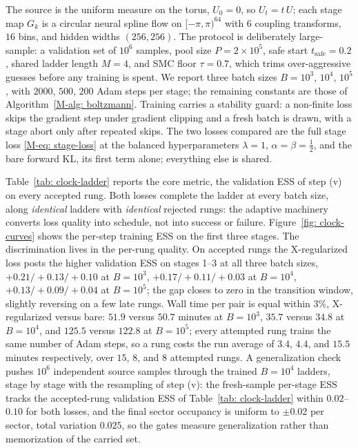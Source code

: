 \documentclass{article}
\begin{document}
The source is the uniform measure on the torus, $U_0 = 0$, so $U_t = t\, U$; each stage map $G_k$ is a circular neural spline flow on $[-\pi, \pi)^{64}$ with $6$ coupling transforms, $16$ bins, and hidden widths $(256, 256)$. The protocol is deliberately large-sample: a validation set of $10^6$ samples, pool size $P = 2 \times 10^5$, safe start $t_{\mathrm{safe}} = 0.2$, shared ladder length $M = 4$, and SMC floor $\tau = 0.7$, which trims over-aggressive guesses before any training is spent. We report three batch sizes $B = 10^3$, $10^4$, $10^5$, with $2000$, $500$, $200$ Adam steps per stage; the remaining constants are those of Algorithm~\ref{M-alg: boltzmann}. Training carries a stability guard: a non-finite loss skips the gradient step under gradient clipping and a fresh batch is drawn, with a stage abort only after repeated skips. The two losses compared are the full stage loss \eqref{M-eq: stage-loss} at the balanced hyperparameters $\lambda = 1$, $\alpha = \beta = \frac12$, and the bare forward KL, its first term alone; everything else is shared.

Table~\ref{tab: clock-ladder} reports the core metric, the validation ESS of step (v) on every accepted rung. Both losses complete the ladder at every batch size, along \emph{identical} ladders with \emph{identical} rejected rungs: the adaptive machinery converts loss quality into schedule, not into success or failure. Figure~\ref{fig: clock-curves} shows the per-step training ESS on the first three stages. The discrimination lives in the per-rung quality. On accepted rungs the X-regularized loss posts the higher validation ESS on stages 1--3 at all three batch sizes, $+0.21/+0.13/+0.10$ at $B = 10^3$, $+0.17/+0.11/+0.03$ at $B = 10^4$, $+0.13/+0.09/+0.04$ at $B = 10^5$; the gap closes to zero in the transition window, slightly reversing on a few late rungs. Wall time per pair is equal within $3\%$, X-regularized versus bare: $51.9$ versus $50.7$ minutes at $B = 10^3$, $35.7$ versus $34.8$ at $B = 10^4$, and $125.5$ versus $122.8$ at $B = 10^5$; every attempted rung trains the same number of Adam steps, so a rung costs the run average of $3.4$, $4.4$, and $15.5$ minutes respectively, over $15$, $8$, and $8$ attempted rungs. A generalization check pushes $10^6$ independent source samples through the trained $B = 10^4$ ladders, stage by stage with the resampling of step (v): the fresh-sample per-stage ESS tracks the accepted-rung validation ESS of Table~\ref{tab: clock-ladder} within $0.02$--$0.10$ for both losses, and the final sector occupancy is uniform to $\pm 0.02$ per sector, total variation $0.025$, so the gates measure generalization rather than memorization of the carried set.
\end{document}
